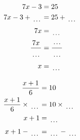 \documentclass[12pt]{article}
\newcounter{minipagecount}
\begin{document}
\begin{multicols}{2}
\begin{minipage}[t]{0.45\textwidth}
    \raggedright %
    \begin{align*} %
        7x - 3 &= 25\\
        7x - 3 + \dotuline{\hspace{5mm}} &= 25 + \dotuline{\hspace{5mm}}\\
        7x &= \dotuline{\hspace{5mm}}\\
        \frac{7x}{\dotuline{\hspace{5mm}}} &= \frac{\dotuline{\hspace{5mm}}}{\dotuline{\hspace{5mm}}}\\
        x &= \dotuline{\hspace{5mm}}\\
    \end{align*}
\end{minipage} %
\noindent{(\theminipagecount)}\hspace{0.1mm} %
\begin{minipage}[t]{0.45\textwidth} %
    \vspace{-26pt}  %
    \raggedright %
    \begin{align*} %
        \frac{x + 1}{6} &= 10\\
        \frac{x + 1}{6} \times\dotuline{\hspace{5mm}} &= 10 \times\dotuline{\hspace{5mm}}\\
        x + 1 &= \dotuline{\hspace{5mm}}\\
        x + 1 - \dotuline{\hspace{5mm}} &= \dotuline{\hspace{5mm}} - \dotuline{\hspace{5mm}}\\

\end{align*}
\end{minipage}
\end{multicols}
\end{document}
